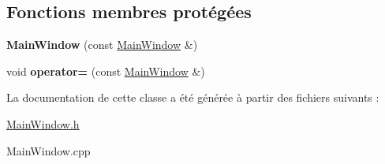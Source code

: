 \subsection*{Fonctions membres protégées}
\begin{DoxyCompactItemize}
\item 
\hypertarget{class_main_window_a6a060b895950b0ada1fc165f64288e14}{{\bfseries Main\-Window} (const \hyperlink{class_main_window}{Main\-Window} \&)}\label{class_main_window_a6a060b895950b0ada1fc165f64288e14}

\item 
\hypertarget{class_main_window_aa97903ff6a8044f898a59f243d3aa739}{void {\bfseries operator=} (const \hyperlink{class_main_window}{Main\-Window} \&)}\label{class_main_window_aa97903ff6a8044f898a59f243d3aa739}

\end{DoxyCompactItemize}


La documentation de cette classe a été générée à partir des fichiers suivants \-:\begin{DoxyCompactItemize}
\item 
\hyperlink{_main_window_8h}{Main\-Window.\-h}\item 
Main\-Window.\-cpp\end{DoxyCompactItemize}
